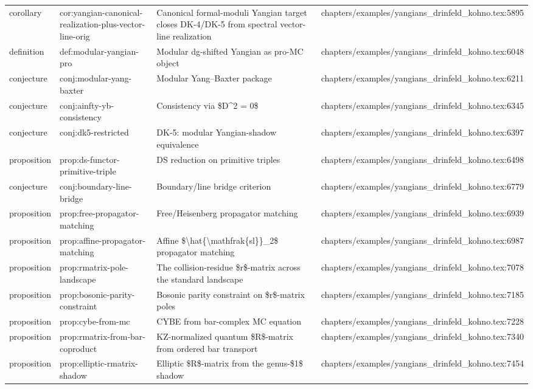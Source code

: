 \documentclass[11pt]{article}
\begin{document}
\begin{longtable}{L{0.10\textwidth}L{0.26\textwidth}L{0.42\textwidth}L{0.22\textwidth}}
corollary & cor:yangian-canonical-realization-plus-vector-line-orig & Canonical formal-moduli Yangian target closes DK-4/DK-5 from spectral vector-line realization & chapters/examples/yangians\_drinfeld\_kohno.tex:5895\\
definition & def:modular-yangian-pro & Modular dg-shifted Yangian as pro-MC object & chapters/examples/yangians\_drinfeld\_kohno.tex:6048\\
conjecture & conj:modular-yang-baxter & Modular Yang--Baxter package & chapters/examples/yangians\_drinfeld\_kohno.tex:6211\\
conjecture & conj:ainfty-yb-consistency & Consistency via \$D\textasciicircum{}2 = 0\$ & chapters/examples/yangians\_drinfeld\_kohno.tex:6345\\
conjecture & conj:dk5-restricted & DK-5: modular Yangian-shadow equivalence & chapters/examples/yangians\_drinfeld\_kohno.tex:6397\\
proposition & prop:ds-functor-primitive-triple & DS reduction on primitive triples & chapters/examples/yangians\_drinfeld\_kohno.tex:6498\\
conjecture & conj:boundary-line-bridge & Boundary/line bridge criterion & chapters/examples/yangians\_drinfeld\_kohno.tex:6779\\
proposition & prop:free-propagator-matching & Free/Heisenberg propagator matching & chapters/examples/yangians\_drinfeld\_kohno.tex:6939\\
proposition & prop:affine-propagator-matching & Affine \$\textbackslash{}hat\{\textbackslash{}mathfrak\{sl\}\}\_2\$ propagator matching & chapters/examples/yangians\_drinfeld\_kohno.tex:6987\\
proposition & prop:rmatrix-pole-landscape & The collision-residue \$r\$-matrix across the standard landscape & chapters/examples/yangians\_drinfeld\_kohno.tex:7078\\
proposition & prop:bosonic-parity-constraint & Bosonic parity constraint on \$r\$-matrix poles & chapters/examples/yangians\_drinfeld\_kohno.tex:7185\\
proposition & prop:cybe-from-mc & CYBE from bar-complex MC equation & chapters/examples/yangians\_drinfeld\_kohno.tex:7228\\
proposition & prop:rmatrix-from-bar-coproduct & KZ-normalized quantum \$R\$-matrix from ordered bar transport & chapters/examples/yangians\_drinfeld\_kohno.tex:7340\\
proposition & prop:elliptic-rmatrix-shadow & Elliptic \$R\$-matrix from the genus-\$1\$ shadow & chapters/examples/yangians\_drinfeld\_kohno.tex:7454\\

\end{longtable}
\end{document}

